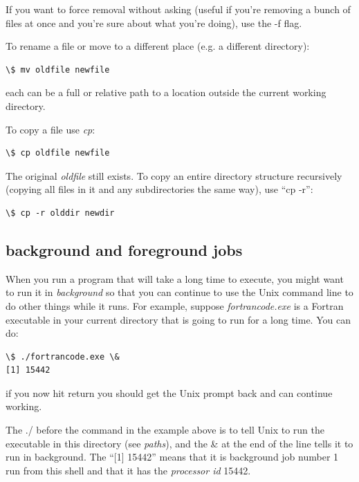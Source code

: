 \documentclass[letterpaper,10pt,english]{sphinxmanual}
\begin{document}
If you want to force removal without asking (useful if you're removing a
bunch of files at once and you're sure about what you're doing), use the -f
flag.

To rename a file or move to a different place (e.g. a different directory):

\begin{Verbatim}[commandchars=\\\{\}]
\$ mv oldfile newfile
\end{Verbatim}

each can be a full or relative path to a location outside the current
working directory.

To copy a file use \emph{cp}:

\begin{Verbatim}[commandchars=\\\{\}]
\$ cp oldfile newfile
\end{Verbatim}

The original \emph{oldfile} still exists.
To copy an entire directory structure recursively (copying all files in it
and any subdirectories the same way), use ``cp -r'':

\begin{Verbatim}[commandchars=\\\{\}]
\$ cp -r olddir newdir
\end{Verbatim}


\subsection{background and foreground jobs}
\label{unix:background-and-foreground-jobs}
When you run a program that will take a long time to execute, you might want
to run it in \emph{background} so that you can continue to use the Unix command
line to do other things while it runs.  For example, suppose
\emph{fortrancode.exe} is a Fortran executable in your current directory
that is going to run for a long time.  You can do:

\begin{Verbatim}[commandchars=\\\{\}]
\$ ./fortrancode.exe \&
[1] 15442
\end{Verbatim}

if you now hit return you should get the Unix prompt back and can continue
working.

The ./ before the command in the example above is
to tell Unix to run the executable in this
directory (see \emph{paths}), and the \& at the end of the line tells it to
run in background.  The ``{[}1{]} 15442'' means that it is background job number 1
run from this shell and that it has the \emph{processor id} 15442.
\end{document}
